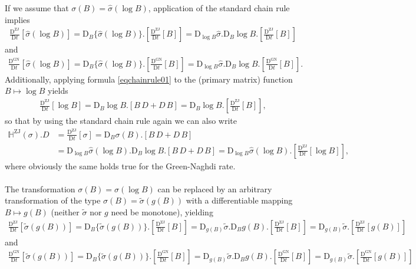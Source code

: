 \documentclass[10pt]{article}
\numberwithin{theoremCounter}{section}
\theoremstyle{plain}
\theoremstyle{definition}
\newcommand{\DD}{\mathrm{D}}
\DeclareMathOperator{\ZJ}{ZJ}
\DeclareMathOperator{\GN}{GN}
\def\H{\mathbb{H}}
\numberwithin{equation}{section}
\begin{document}
If we assume that $\sigma(B) = \widehat{\sigma}(\log B)$, application of the standard chain rule implies
	\begin{align}
	\label{eqchainZJ01}
	\frac{\DD^{\ZJ}}{\DD t}[\widehat{\sigma}(\log B)] = \DD_B \{\widehat{\sigma}(\log B)\}.\!\left[\frac{\DD^{\ZJ}}{\DD t}[B]\right] = \DD_{\log B} \widehat{\sigma} . \DD_B \log B .\!\left[\frac{\DD^{\ZJ}}{\DD t}[B]\right]
	\end{align}
and
	\begin{align}
	\label{eqchainGN01}
	\frac{\DD^{\GN}}{\DD t}[\widehat{\sigma}(\log B)] = \DD_B \{\widehat{\sigma}(\log B)\}.\!\left[\frac{\DD^{\GN}}{\DD t}[B]\right] = \DD_{\log B} \widehat{\sigma} . \DD_B \log B .\!\left[\frac{\DD^{\GN}}{\DD t}[B]\right].
	\end{align}
Additionally, applying formula \eqref{eqchainrule01} to the (primary matrix) function $B \mapsto \log B$ yields
	\begin{align}
	\frac{\DD^{\ZJ}}{\DD t}[\log B] = \DD_B \log B . [B \, D + D \, B]=\DD_B \log B.\! \left[\frac{\DD^{\ZJ}}{\DD t}[B]\right],
	\end{align}
so that by using the standard chain rule again we can also write
	\begin{equation}
	\begin{alignedat}{2}
	\H^{\ZJ}(\sigma).D &= \frac{\DD^{\ZJ}}{\DD t}[\sigma] = \DD_B \sigma(B) . [B \, D + D \, B] \\
	&= \DD_{\log B} \widehat{\sigma}(\log B) . \DD_B \log B . [B \, D + D \, B] = \DD_{\log B} \widehat{\sigma}(\log B).\!\left[\frac{\DD^{\ZJ}}{\DD t}[\log B]\right],
	\end{alignedat}
	\end{equation}
where obviously the same holds true for the Green-Naghdi rate. \\
\\
The transformation $\sigma(B) = \widehat \sigma(\log B)$ can be replaced by an arbitrary transformation of the type $\sigma(B) = \widetilde \sigma(g(B))$ with a differentiable  mapping $B \mapsto g(B)$ (neither $\widetilde \sigma$ nor $g$ need be monotone), yielding
	\begin{align}
	\frac{\DD^{\ZJ}}{\DD t}[\widetilde{\sigma}(g(B))] = \DD_B \{\widetilde{\sigma}(g(B))\}.\!\left[\frac{\DD^{\ZJ}}{\DD t}[B]\right] = \DD_{g(B)} \widetilde{\sigma} . \DD_B g(B) .\!\left[\frac{\DD^{\ZJ}}{\DD t}[B]\right] = \DD_{g(B)} \widetilde \sigma .\!\left[ \frac{\DD^{\ZJ}}{\DD t}[g(B)] \right]
	\end{align}
and
	\begin{align}
	\frac{\DD^{\GN}}{\DD t}[\widetilde{\sigma}(g(B))] = \DD_B \{\widetilde{\sigma}(g(B))\}.\!\left[\frac{\DD^{\GN}}{\DD t}[B]\right] = \DD_{g(B)} \widetilde{\sigma} . \DD_B g(B) .\!\left[\frac{\DD^{\GN}}{\DD t}[B]\right] = \DD_{g(B)} \widetilde \sigma .\!\left[ \frac{\DD^{\GN}}{\DD t}[g(B)] \right]
	\end{align}
\end{document}
